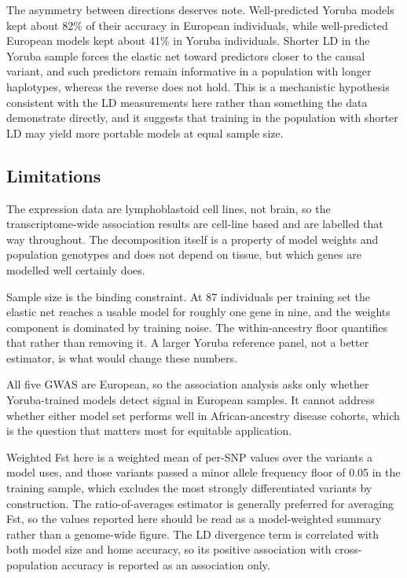\documentclass[conference]{IEEEtran}
\begin{document}
The asymmetry between directions deserves note. Well-predicted Yoruba models kept about 82\% of their accuracy in European individuals, while well-predicted European models kept about 41\% in Yoruba individuals. Shorter LD in the Yoruba sample forces the elastic net toward predictors closer to the causal variant, and such predictors remain informative in a population with longer haplotypes, whereas the reverse does not hold. This is a mechanistic hypothesis consistent with the LD measurements here rather than something the data demonstrate directly, and it suggests that training in the population with shorter LD may yield more portable models at equal sample size.

\subsection{Limitations}
The expression data are lymphoblastoid cell lines, not brain, so the transcriptome-wide association results are cell-line based and are labelled that way throughout. The decomposition itself is a property of model weights and population genotypes and does not depend on tissue, but which genes are modelled well certainly does.

Sample size is the binding constraint. At 87 individuals per training set the elastic net reaches a usable model for roughly one gene in nine, and the weights component is dominated by training noise. The within-ancestry floor quantifies that rather than removing it. A larger Yoruba reference panel, not a better estimator, is what would change these numbers.

All five GWAS are European, so the association analysis asks only whether Yoruba-trained models detect signal in European samples. It cannot address whether either model set performs well in African-ancestry disease cohorts, which is the question that matters most for equitable application.

Weighted Fst here is a weighted mean of per-SNP values over the variants a model uses, and those variants passed a minor allele frequency floor of 0.05 in the training sample, which excludes the most strongly differentiated variants by construction. The ratio-of-averages estimator is generally preferred for averaging Fst, so the values reported here should be read as a model-weighted summary rather than a genome-wide figure. The LD divergence term is correlated with both model size and home accuracy, so its positive association with cross-population accuracy is reported as an association only.
\end{document}
